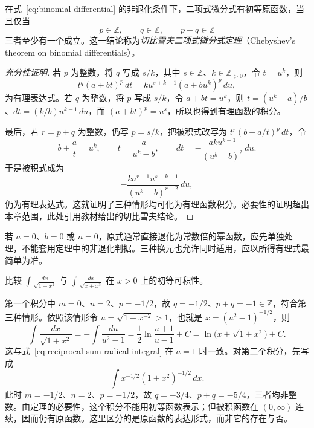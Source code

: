 \documentclass[UTF8,12pt,a4paper,fontset=fandol]{ctexbook}
\begin{document}
\begin{theorem}[二项式微分式的初等可积条件]
\label{thm:chebyshev-binomial-integrals}
在式~\eqref{eq:binomial-differential} 的非退化条件下，二项式微分式有初等原函数，当且仅当
\begin{equation}
    p\in\mathbb{Z},\qquad q\in\mathbb{Z},\qquad
    p+q\in\mathbb{Z}
    \label{eq:binomial-elementary-integrability-conditions}
\end{equation}
三者至少有一个成立。这一结论称为\emph{切比雪夫二项式微分式定理}（Chebyshev's theorem on binomial differentials）。
\end{theorem}

\begin{proof}[充分性证明]
若 $p$ 为整数，将 $q$ 写成 $s/k$，其中 $s\in\mathbb{Z}$、$k\in\mathbb{Z}_{>0}$，令 $t=u^k$，则
\[
    t^q(a+bt)^p\,dt=k u^{s+k-1}(a+bu^k)^p\,du,
\]
为有理表达式。若 $q$ 为整数，将 $p$ 写成 $s/k$，令 $a+bt=u^k$，则 $t=(u^k-a)/b$、$dt=(k/b)u^{k-1}\,du$，而 $(a+bt)^p=u^s$，所以也得到有理函数的积分。

最后，若 $r=p+q$ 为整数，仍写 $p=s/k$，把被积式改写为 $t^r(b+a/t)^p\,dt$，令
\[
    b+\frac at=u^k,\qquad
    t=\frac{a}{u^k-b},\qquad
    dt=-\frac{ak u^{k-1}}{(u^k-b)^2}\,du.
\]
于是被积式成为
\[
    -\frac{k a^{r+1}u^{s+k-1}}{(u^k-b)^{r+2}}\,du,
\]
仍为有理表达式。这就证明了三种情形均可化为有理函数积分。必要性的证明超出本章范围，此处引用教材给出的切比雪夫结论。
\end{proof}

若 $a=0$、$b=0$ 或 $n=0$，原式通常直接退化为常数倍的幂函数，应先单独处理，不能套用定理中的非退化判据。三种换元也允许同时适用，应以所得有理式最简单为准。

\begin{example}
\label{ex:binomial-integrability-and-nonintegrability}
比较 $\displaystyle\int\frac{dx}{\sqrt{1+x^2}}$ 与 $\displaystyle\int\frac{dx}{\sqrt{x+x^3}}$ 在 $x>0$ 上的初等可积性。
\end{example}

\begin{solve}
第一个积分中 $m=0$、$n=2$、$p=-1/2$，故 $q=-1/2$、$p+q=-1\in\mathbb{Z}$，符合第三种情形。依照该情形令 $u=\sqrt{1+x^{-2}}>1$，也就是 $x=(u^2-1)^{-1/2}$，则
\[
    \int\frac{dx}{\sqrt{1+x^2}}
      =-\int\frac{du}{u^2-1}
      =\frac12\ln\frac{u+1}{u-1}+C
      =\ln\bigl(x+\sqrt{1+x^2}\bigr)+C.
\]
这与式~\eqref{eq:reciprocal-sum-radical-integral} 在 $a=1$ 时一致。对第二个积分，先写成
\[
    \int x^{-1/2}(1+x^2)^{-1/2}\,dx.
\]
此时 $m=-1/2$、$n=2$、$p=-1/2$，故 $q=-3/4$、$p+q=-5/4$，三者均非整数。由定理的必要性，这个积分不能用初等函数表示；但被积函数在 $(0,\infty)$ 连续，因而仍有原函数。这里区分的是原函数的表达形式，而非它的存在与否。
\end{solve}
\end{document}
